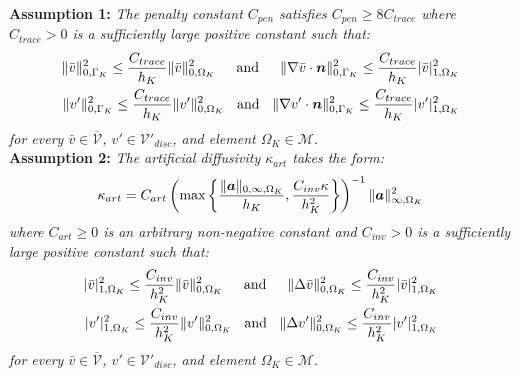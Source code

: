 \documentclass[11pt]{article}
\begin{document}
\noindent \textbf{Assumption 1:} \textit{The penalty constant $C_{pen}$ satisfies $C_{pen} \geq 8 C_{trace}$ where $C_{trace} > 0$ is a sufficiently large positive constant such that:}
\begin{eqnarray}
\| \bar{v} \|^2_{0,\Gamma_K} \leq \frac{C_{trace}}{h_K} \| \bar{v} \|^2_{0,\Omega_K} \hspace{15pt} \textup{and} \hspace{15pt} \| \nabla \bar{v} \cdot \bm{n} \|^2_{0,\Gamma_K} \leq \frac{C_{trace}}{h_K} | \bar{v} |^2_{1,\Omega_K} \nonumber \\
\| v' \|^2_{0,\Gamma_K} \leq \frac{C_{trace}}{h_K} \| v' \|^2_{0,\Omega_K} \hspace{9pt} \textup{and} \hspace{9pt} \| \nabla v' \cdot \bm{n} \|^2_{0,\Gamma_K} \leq \frac{C_{trace}}{h_K} | v' |^2_{1,\Omega_K} \nonumber
\end{eqnarray}
\textit{for every $\bar{v} \in \overline{\mathcal{V}}$, $v' \in \mathcal{V}'_{disc}$, and element $\Omega_K \in \mathcal{M}$.}\\

\noindent \textbf{Assumption 2:} \textit{The artificial diffusivity $\kappa_{art}$ takes the form:}
\begin{equation}
\kappa_{art} = C_{art} \left( \textup{max}\left\{ \frac{\| \bm{a} \|_{0,\infty,\Omega_K}}{h_K}, \frac{C_{inv} \kappa}{h^2_K} \right \}\right)^{-1} \| \bm{a} \|^2_{\infty,\Omega_K} \nonumber
\end{equation}
\textit{where $C_{art} \geq 0$ is an arbitrary non-negative constant and $C_{inv} > 0$ is a sufficiently large positive constant such that:}
\begin{eqnarray}
| \bar{v} |^2_{1,\Omega_K} \leq \frac{C_{inv}}{h^2_K} \| \bar{v} \|^2_{0,\Omega_K} \hspace{15pt} \textup{and} \hspace{15pt} \| \Delta \bar{v} \|^2_{0,\Omega_K} \leq \frac{C_{inv}}{h^2_K} | \bar{v} |^2_{1,\Omega_K} \nonumber \\
| v' |^2_{1,\Omega_K} \leq \frac{C_{inv}}{h^2_K} \| v' \|^2_{0,\Omega_K}  \hspace{9pt} \textup{and} \hspace{9pt} \| \Delta v' \|^2_{0,\Omega_K} \leq \frac{C_{inv}}{h^2_K} | v' |^2_{1,\Omega_K} \nonumber
\end{eqnarray}
\textit{for every $\bar{v} \in \overline{\mathcal{V}}$, $v' \in \mathcal{V}'_{disc}$, and element $\Omega_K \in \mathcal{M}$.}\\
\end{document}
